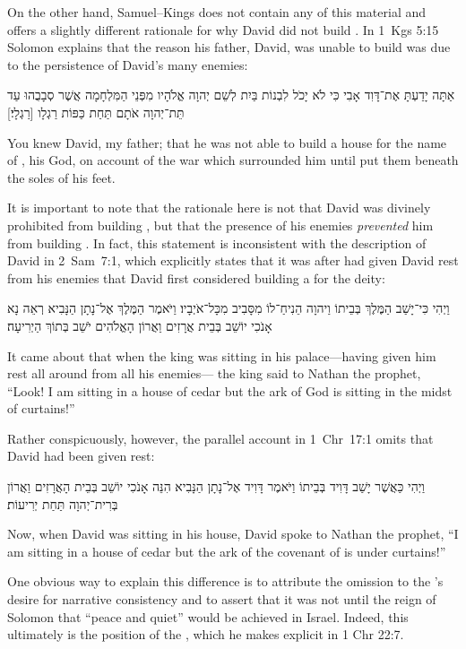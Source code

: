 On the other hand, Samuel--Kings does not contain any of this material and offers a slightly different rationale for why David did not build \thetemple. In 1~Kgs 5:15 Solomon explains that the reason his father, David, was unable to build \thetemple was due to the persistence of David's many enemies:
\begin{hebrewtext}
    אַתָּה יָדַעְתָּ אֶת־דָּוִד אָבִי כִּי לֹא יָכֹל לִבְנוֹת בַּיִת לְשֵׁם יְהוָה אֱלֹהָיו מִפְּנֵי הַמִּלְחָמָה אֲשֶׁר סְבָבֻהוּ עַד תֵּת־יְהוָה אֹתָם תַּחַת כַּפּוֹת רַגְלָו [רַגְלָי׃] 
\end{hebrewtext}
\begin{translation}
    You knew David, my father; that he was not able to build a house for the name of \yahweh, his God, on account of the war which surrounded him until \yahweh put them beneath the soles of his feet.
\end{translation}
\noindent
It is important to note that the rationale here is not that David was divinely prohibited from building \thetemple, but that the presence of his enemies \emph{prevented} him from building \thetemple. In fact, this statement is inconsistent with the description of David in 2~Sam~7:1, which explicitly states that it was after \yahweh had given David rest from his enemies that David first considered building a \temple for the deity:
    \begin{hebrewtext}
        וַיְהִי כִּי־יָשַׁב הַמֶּלֶךְ בְּבֵיתוֹ וַיהוָה הֵנִיחַ־לוֹ מִסָּבִיב מִכָּל־אֹיְבָיו׃
        וַיֹּאמֶר הַמֶּלֶךְ אֶל־נָתָן הַנָּבִיא רְאֵה נָא אָנֹכִי יוֹשֵׁב בְּבֵית אֲרָזִים וַאֲרוֹן הָאֱלֹהִים יֹשֵׁב בְּתוֹךְ הַיְרִיעָה׃
    \end{hebrewtext}
    \begin{translation}
        It came about that when the king was sitting in his palace---\yahweh having given him rest all around from all his enemies---
        the king said to Nathan the prophet, ``Look! I am sitting in a house of cedar but the ark of God is sitting in the midst of curtains!''
    \end{translation}
\noindent
Rather conspicuously, however, the parallel account in 1~Chr~17:1 omits that David had been given rest:
\begin{hebrewtext}
    וַיְהִי כַּאֲשֶׁר יָשַׁב דָּוִיד בְּבֵיתוֹ וַיֹּאמֶר דָּוִיד אֶל־נָתָן הַנָּבִיא הִנֵּה אָנֹכִי יוֹשֵׁב בְּבֵית הָאֲרָזִים וַאֲרוֹן בְּרִית־יְהוָה תַּחַת יְרִיעוֹת׃
\end{hebrewtext}
\begin{translation}
    Now, when David was sitting in his house, David spoke to Nathan the prophet, ``I am sitting in a house of cedar but the ark of the covenant of \yahweh is under curtains!'' 
\end{translation}
\noindent
One obvious way to explain this difference is to attribute the omission to the \chronicler's desire for narrative consistency and to assert that it was not until the reign of Solomon that ``peace and quiet'' would be achieved in Israel. Indeed, this ultimately is the position of the \chronicler, which he makes explicit in 1 Chr 22:7. 

